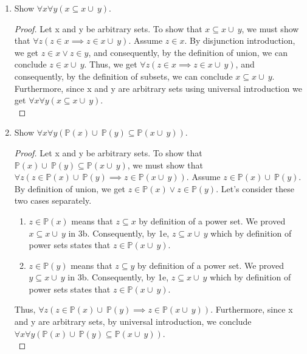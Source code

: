 \documentclass{article}
\newcommand{\union}{\cup\:}
\begin{document}
\begin{enumerate}
\begin{enumerate}
\begin{proof}
        \end{proof}
    \item Show $\forall x \forall y (x \subseteq x \union y)$.
      \begin{proof} 
      Let x and y be arbitrary sets. To show that $x \subseteq x \union y$, we must show that $\forall z(z \in x \implies z \in x \union y)$. Assume $z \in x$. By disjunction introduction, we get $z \in x \lor z \in y$, and consequently, by the definition of union, we can conclude $z \in x \union y$. Thus, we get $\forall z(z \in x \implies z \in x \union y)$, and consequently, by the definition of subsets, we can conclude $x \subseteq x \union y$. Furthermore, since x and y are arbitrary sets using universal introduction we get $\forall x \forall y (x \subseteq x \union y)$.\\
      \end{proof}
\pagebreak
    \item Show $\forall x \forall y (\mathbb{P}(x) \union \mathbb{P}(y) \subseteq \mathbb{P}(x \union y))$.
      \begin{proof}
      Let x and y be arbitrary sets. To show that $\mathbb{P}(x)\union\mathbb{P}(y) \subseteq \mathbb{P}(x \union y)$, we must show that $\forall z (z \in \mathbb{P}(x)\union\mathbb{P}(y) \implies z \in \mathbb{P}(x \union y))$. Assume $z \in \mathbb{P}(x)\union\mathbb{P}(y)$. By definition of union, we get $z \in \mathbb{P}(x)\lor z \in \mathbb{P}(y)$. Let's consider these two cases separately.
      \begin{enumerate}
          \item $z \in \mathbb{P}(x)$ means that $z \subseteq x$ by definition of a power set. We proved $x \subseteq x \union y$ in 3b. Consequently, by 1e, $z \subseteq x \union y$  which by definition of power sets states that $z \in \mathbb{P}(x \union y)$.
          \item $z \in \mathbb{P}(y)$ means that $z \subseteq y$ by definition of a power set. We proved $y \subseteq x \union y$ in 3b. Consequently, by 1e, $z \subseteq x \union y$ which by definition of power sets states that $z \in \mathbb{P}(x \union y)$.
      \end{enumerate}
      Thus, $\forall z (z \in \mathbb{P}(x)\union\mathbb{P}(y) \implies z \in \mathbb{P}(x \union y))$. Furthermore, since x and y are arbitrary sets, by universal introduction, we conclude $\forall x \forall y (\mathbb{P}(x) \union \mathbb{P}(y) \subseteq \mathbb{P}(x \union y))$.\\
      \end{proof}

\end{enumerate}
\end{enumerate}
\end{document}
